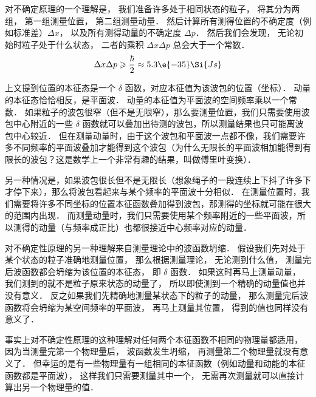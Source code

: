 对不确定原理的一个理解是， 我们准备许多处于相同状态的粒子， 将其分为两组， 第一组测量位置， 第二组测量动量． 然后计算所有测得位置的不确定度（例如标准差）$\Delta x$， 以及所有测得动量的不确定度 $\Delta p$． 然后我们会发现， 无论初始时粒子处于什么状态， 二者的乘积 $\Delta x \Delta p$ 总会大于一个常数．
\begin{equation}
\Delta x \Delta p \geqslant \frac{\hbar}{2} \approx 5.3\e{-35} \Si{Js}
\end{equation}

上文提到位置的本征态是一个 $\delta$ 函数，对应本征值为该波包的位置（坐标）． 动量的本征态恰恰相反，是平面波． 动量的本征值为平面波的空间频率乘以一个常数． 如果粒子的波包很窄（但不是无限窄），那么要测量位置，我们只需要使用波包中心附近的一些 $\delta$ 函数就可以叠加出待测的波包，所以测量结果也只可能离波包中心较近． 但在测量动量时，由于这个波包和平面波一点都不像，我们需要许多不同频率的平面波叠加才能得到这个波包（为什么无限长的平面波相加能得到有限长的波包？这是数学上一个非常有趣的结果，叫做傅里叶变换）．

另一种情况是，如果波包很长但不是无限长（想象绳子的一段连续上下抖了许多下才停下来），那么将波包看起来与某个频率的平面波十分相似． 在测量位置时，我们需要将许多不同坐标的位置本征函数叠加得到波包，那测得的坐标就可能在很大的范围内出现． 而测量动量时，我们只需要使用某个频率附近的一些平面波，所以测得的动量（与频率成正比）也都很接近中心频率对应的动量．

对不确定性原理的另一种理解来自测量理论中的波函数坍缩． 假设我们先对处于某个状态的粒子准确地测量位置， 那么根据测量理论， 无论测到什么值， 测量完后波函数都会坍缩为该位置的本征态， 即 $\delta$ 函数． 如果这时再马上测量动量， 我们测到的就不是粒子原来状态的动量了， 所以即使测到一个精确的动量值也并没有意义． 反之如果我们先精确地测量某状态下的粒子的动量， 那么测量完后波函数将会坍缩为某空间频率的平面波， 再马上测量其位置， 得到的值也同样没有意义了．

事实上对不确定性原理的这种理解对任何两个本征函数不相同的物理量都适用， 因为当测量完第一个物理量后， 波函数发生坍缩， 再测量第二个物理量就没有意义了． 但幸运的是有一些物理量有一组相同的本征函数（例如动量和动能的本征函数都是平面波）， 这样我们只需要测量其中一个， 无需再次测量就可以直接计算出另一个物理量的值．
